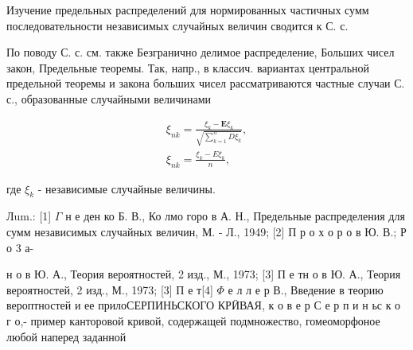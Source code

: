 \documentclass[10pt]{article}
\begin{document}
Изучение предельных распределений для нормированных частичных сумм последовательности независимых случайных величин сводится к С. с.



По поводу С. с. см. также Безгранично делимое распределение, Больших чисел закон, Предельные теоремы. Так, напр., в классич. вариантах центральной предельной теоремы и закона больших чисел рассматриваются частные случаи С. с., образованные случайными величинами



\[

\begin{gathered}

\xi_{n k}=\frac{\xi_{k}-\mathbf{E} \xi_{k}}{\sqrt{\sum_{k=1}^{n} D \xi_{k}}}, \\

\xi_{n k}=\frac{\xi_{k}-E \xi_{k}}{n},

\end{gathered}

\]



где $\xi_{k}$ - независимые случайные величины.



Лum.: [1] $\Gamma$ н е ден ко Б. В., Ко лмо горо в А. Н., Предельные распределения для сумм независимых случайных величин, М. - Л., 1949; [2] П р о х о р о в Ю. В.; Р о 3 а-

н о в Ю. А., Теория вероятностей, 2 изд., М., 1973; [3] П е тн о в Ю. А., Теория вероятностей, 2 изд., М., 1973; [3] П е т[4] $\Phi$ е л л е р В., Введение в теорию вероптностей и ее прилоСЕРПИНЬСКОГО КРӤВАЯ, к о в е р С е р п и н ьс к о г о,- пример канторовой кривой, содержащей подмножество, гомеоморфоное любой наперед заданной
\end{document}
